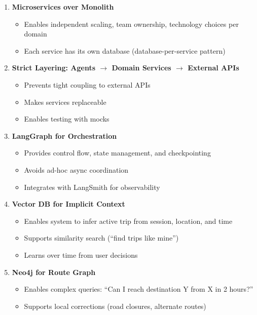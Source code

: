 \documentclass[11pt]{article}
\begin{document}
\begin{enumerate}
    \item \textbf{Microservices over Monolith}
    \begin{itemize}
        \item Enables independent scaling, team ownership, technology choices per domain
        \item Each service has its own database (database-per-service pattern)
    \end{itemize}

    \item \textbf{Strict Layering: Agents $\rightarrow$ Domain Services $\rightarrow$ External APIs}
    \begin{itemize}
        \item Prevents tight coupling to external APIs
        \item Makes services replaceable
        \item Enables testing with mocks
    \end{itemize}

    \item \textbf{LangGraph for Orchestration}
    \begin{itemize}
        \item Provides control flow, state management, and checkpointing
        \item Avoids ad-hoc async coordination
        \item Integrates with LangSmith for observability
    \end{itemize}

    \item \textbf{Vector DB for Implicit Context}
    \begin{itemize}
        \item Enables system to infer active trip from session, location, and time
        \item Supports similarity search (``find trips like mine'')
        \item Learns over time from user decisions
    \end{itemize}

    \item \textbf{Neo4j for Route Graph}
    \begin{itemize}
        \item Enables complex queries: ``Can I reach destination Y from X in 2 hours?''
        \item Supports local corrections (road closures, alternate routes)
    \end{itemize}


\end{enumerate}
\end{document}
